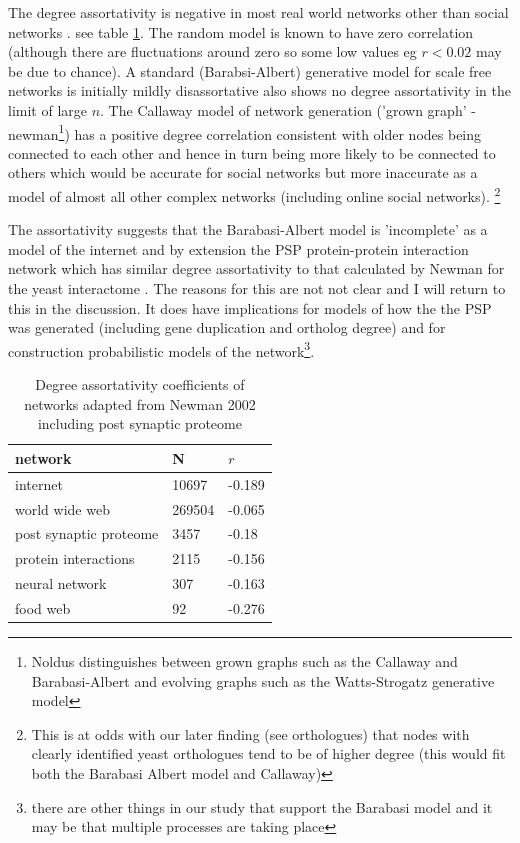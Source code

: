 The degree assortativity is negative in most real world networks other than social networks \cite{newman2002assortative}.  see table \ref{Table:DegreeAssortativityNewman}. The random model is known to have zero correlation (although there are fluctuations around zero so some low values eg $r<0.02$ may be due to chance)\cite{noldus2015assortativity}. A standard (Barabsi-Albert) generative model for scale free networks is initially mildly disassortative\cite{noldus2015assortativity} also shows no degree assortativity in the limit of large $n$\cite{noldus2015assortativity}. The Callaway model of network generation ('grown graph' - newman\footnote{Noldus distinguishes between grown graphs such as the Callaway and Barabasi-Albert and evolving graphs such as the Watts-Strogatz generative model}) has a positive degree correlation consistent with older nodes being connected to each other and hence in turn being more likely to be connected to others which would be accurate for social networks but more inaccurate as a model of almost all other complex networks (including online social networks). \footnote{This is at odds with our later finding (see orthologues) that nodes with clearly identified yeast orthologues tend to be of higher degree (this would fit both the Barabasi Albert model and Callaway)} 

The assortativity suggests that the Barabasi-Albert model is 'incomplete' as a model of the internet \cite{newman2002assortative} and by extension the PSP protein-protein interaction network which has similar degree assortativity to that calculated by Newman for the yeast interactome \cite{jeong2001lethality}. The reasons for this are not not clear and I will return to this in the discussion. It does have implications for models of how the the PSP was generated (including gene duplication and ortholog degree) and for construction probabilistic models of the network\footnote{there are other things in our study that support the Barabasi model and it may be that multiple processes are taking place}. 


\begin{table}[]
    \centering
    \begin{tabular}{lll}
    \toprule
       network  &N& $r$  \\
       \midrule
       internet & 10697&-0.189\\
       world wide web &269504 & -0.065\\
       post synaptic proteome & 3457 & -0.18\\
       protein interactions & 2115 & -0.156\\
       neural network & 307 & -0.163\\
       food web & 92 & -0.276 \\
       \bottomrule
    \end{tabular}
    \caption{Degree assortativity coefficients of networks adapted from Newman 2002 \cite{newman2002assortative} including post synaptic proteome}
    \label{Table:DegreeAssortativityNewman}
\end{table}


